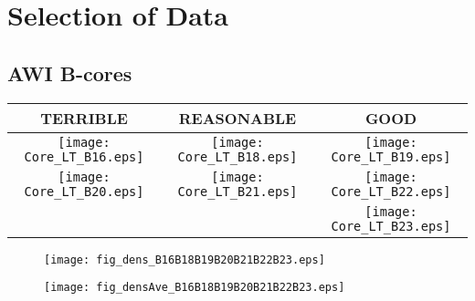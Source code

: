 \documentclass[../../CompleteThesis/Complete_1stDraft]{subfiles}
\begin{document}
\section[Selection][Selection]{Selection of Data}
\label{Sec:Data_Selection}
\subsection[AWI B-cores]{AWI B-cores}
\label{Subsec:Data_Selection_Bcores}

\newpage
\begin{rotatepage}
	\begin{landscape}
		\begin{table}
			\centering
			\begin{tabular}{c||c||c}
				\textcolor{BrickRed}{\textbf{TERRIBLE}} & \textcolor{YellowOrange}{\textbf{REASONABLE}} & \textcolor{OliveGreen}{\textbf{GOOD}} \\
				\hline
				\texttt{[image: Core\_LT\_B16.eps]} & \texttt{[image: Core\_LT\_B18.eps]} & \texttt{[image: Core\_LT\_B19.eps]} \\
				\texttt{[image: Core\_LT\_B20.eps]} & \texttt{[image: Core\_LT\_B21.eps]} & \texttt{[image: Core\_LT\_B22.eps]} \\	
				& & \texttt{[image: Core\_LT\_B23.eps]} \\
			\end{tabular}
		\end{table}
	\end{landscape}
\end{rotatepage}
\newpage

\begin{rotatepage}
	\begin{landscape}
		\begin{figure}[h]
			\centering
			\texttt{[image: fig\_dens\_B16B18B19B20B21B22B23.eps]}
			\label{fig:dens}
			\caption{}
		\end{figure}
	\end{landscape}
\end{rotatepage}
\newpage
\begin{rotatepage}
	\begin{landscape}
		\begin{figure}[h]
			\centering
			\texttt{[image: fig\_densAve\_B16B18B19B20B21B22B23.eps]}
			\label{fig:densAve}
			\caption{}
		\end{figure}
	\end{landscape}
\end{rotatepage}
\newpage 
\end{document}
